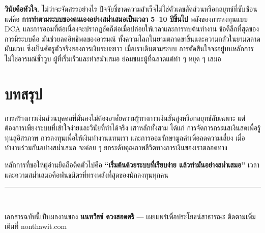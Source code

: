 \documentclass[14pt,a4paper,twocolumn]{extarticle}
\begin{document}
\textbf{วินัยคือหัวใจ.} ไม่ว่าจะจัดสรรอย่างไร ปัจจัยชี้ขาดความสำเร็จไม่ใช่ตัวเลขสัดส่วนหรือกลยุทธ์ที่ซับซ้อน แต่คือ \textbf{การทำตามระบบของตนเองอย่างสม่ำเสมอเป็นเวลา 5–10 ปีขึ้นไป} พลังของการลงทุนแบบ DCA และการออมที่ต่อเนื่องจะปรากฏชัดก็ต่อเมื่อปล่อยให้เวลาและการทบต้นทำงาน ข้อดีลึกที่สุดของการมีระบบคือ มันช่วยลดอิทธิพลของอารมณ์ ทั้งความโลภในยามตลาดขาขึ้นและความกลัวในยามตลาดผันผวน ซึ่งเป็นศัตรูตัวจริงของการเงินระยะยาว เมื่อเราเดินตามระบบ การตัดสินใจจะอยู่บนหลักการ ไม่ใช่อารมณ์ชั่ววูบ ผู้ที่เริ่มเร็วและทำสม่ำเสมอ ย่อมชนะผู้ที่ฉลาดแต่ทำ ๆ หยุด ๆ เสมอ

\section{บทสรุป}
การสร้างการเงินส่วนบุคคลที่มั่นคงไม่ต้องอาศัยความรู้ทางการเงินขั้นสูงหรือกลยุทธ์ลับเฉพาะ แต่ต้องการเพียงระบบที่เข้าใจง่ายและวินัยที่ทำได้จริง เสาหลักทั้งสาม ได้แก่ การจัดการกระแสเงินสดเพื่อรู้ทุนสู่อิสรภาพ การลงทุนเพื่อให้เงินทำงานแทนเรา และการออมรักษามูลค่าเพื่อลดความเสี่ยง เมื่อทำงานร่วมกันอย่างสม่ำเสมอ จะค่อย ๆ ยกระดับคุณภาพชีวิตทางการเงินของเราตลอดทาง

หลักการที่ขอให้ผู้อ่านยึดถือติดตัวไปคือ \textbf{“เริ่มต้นด้วยระบบที่เรียบง่าย แล้วทำมันอย่างสม่ำเสมอ”} เวลาและความสม่ำเสมอคือพันธมิตรที่ทรงพลังที่สุดของนักลงทุนทุกคน

\vspace{1em}
\noindent\rule{\linewidth}{0.4pt}\\
{\small\raggedright เอกสารฉบับนี้เป็นผลงานของ \textbf{นนทวิชช์ ดวงสอดศรี} — เผยแพร่เพื่อประโยชน์สาธารณะ ติดตามเพิ่มเติมที่ nonthawit.com\par}
\end{document}
